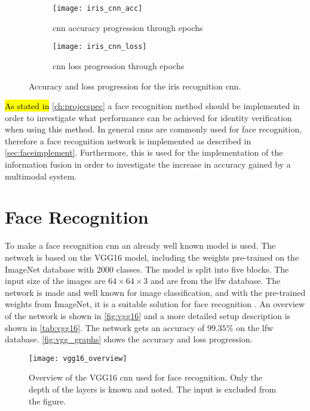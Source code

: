 \begin{figure}[H]
	\centering
	\begin{subfigure}{0.48\textwidth}
		\centering
		\texttt{[image: iris\_cnn\_acc]}
		\caption{\gls{cnn} accuracy progression through epochs}
		\label{fig:iris_cnn_acc}
	\end{subfigure}
	\begin{subfigure}{0.48\textwidth}
		\centering
		\texttt{[image: iris\_cnn\_loss]}
		\caption{\gls{cnn} loss progression through epochs}
		\label{fig:iris_cnn_loss}
	\end{subfigure}
	\caption{Accuracy and loss progression for the iris recognition \gls{cnn}.}
	\label{fig:iris_graphs}
\end{figure}

\hl{As stated in} \autoref{ch:projecspec} a face recognition method should be implemented in order to investigate what performance can be achieved for identity verification when using this method. In general \gls{cnn}s are commonly used for face recognition, therefore a face recognition network is implemented as described in \autoref{sec:faceimplement}. Furthermore, this is used for the implementation of the information fusion in order to investigate the increase in accuracy gained by a multimodal system.

\section{Face Recognition}
\label{sec:faceimplement}
To make a face recognition \gls{cnn} an already well known model is used. The network is based on the VGG16 model, including the weights pre-trained on the ImageNet database with 2000 classes. The model is split into five blocks. The input size of the images are $64\times64\times3$ and are from the \gls{lfw} database. The network is made and well known for image classification, and with the pre-trained weights from ImageNet, it is a suitable solution for face recognition \citep{Simonyan2015}.
An overview of the network is shown in \autoref{fig:vgg16} and a more detailed setup description is shown in \autoref{tab:vgg16}. The network gets an accuracy of $99.35\%$ on the \gls{lfw} database. \autoref{fig:vgg_graphs} shows the accuracy and loss progression.

\begin{figure}[H]
	\centering
	\texttt{[image: vgg16\_overview]}
	\caption{Overview of the VGG16 \gls{cnn} used for face recognition. Only the depth of the layers is known and noted. The input is excluded from the figure.}
	\label{fig:vgg16}
\end{figure}

